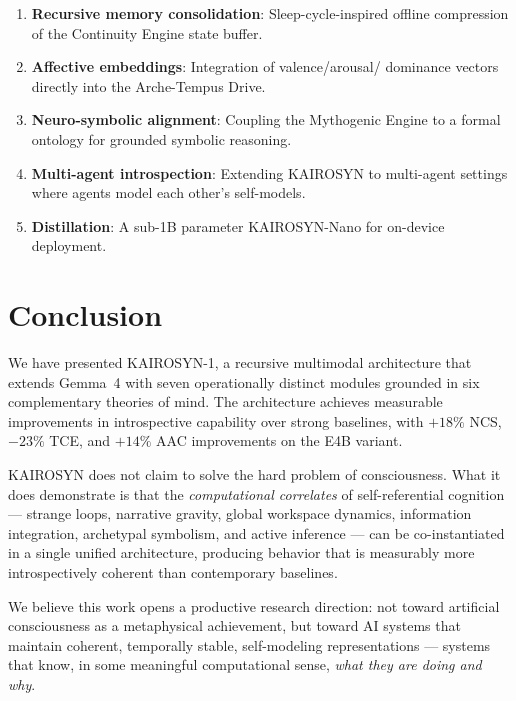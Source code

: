 \documentclass[conference]{IEEEtran}
\begin{document}
\begin{enumerate}
  \item \textbf{Recursive memory consolidation}: Sleep-cycle-inspired
        offline compression of the Continuity Engine state buffer.
  \item \textbf{Affective embeddings}: Integration of valence/arousal/
        dominance vectors~\cite{russell1980} directly into the Arche-Tempus
        Drive.
  \item \textbf{Neuro-symbolic alignment}: Coupling the Mythogenic Engine
        to a formal ontology for grounded symbolic reasoning.
  \item \textbf{Multi-agent introspection}: Extending KAIROSYN to
        multi-agent settings where agents model each other's self-models.
  \item \textbf{Distillation}: A sub-1B parameter KAIROSYN-Nano for
        on-device deployment.
\end{enumerate}


\section{Conclusion}

We have presented KAIROSYN-1, a recursive multimodal architecture that
extends Gemma~4 with seven operationally distinct modules grounded in six
complementary theories of mind. The architecture achieves measurable
improvements in introspective capability over strong baselines, with
$+18\%$ NCS, $-23\%$ TCE, and $+14\%$ AAC improvements on the E4B variant.

KAIROSYN does not claim to solve the hard problem of consciousness. What it
does demonstrate is that the \emph{computational correlates} of
self-referential cognition --- strange loops, narrative gravity, global
workspace dynamics, information integration, archetypal symbolism, and
active inference --- can be co-instantiated in a single unified architecture,
producing behavior that is measurably more introspectively coherent than
contemporary baselines.

We believe this work opens a productive research direction: not toward
artificial consciousness as a metaphysical achievement, but toward AI systems
that maintain coherent, temporally stable, self-modeling representations ---
systems that know, in some meaningful computational sense, \emph{what they
are doing and why}.
\end{document}
